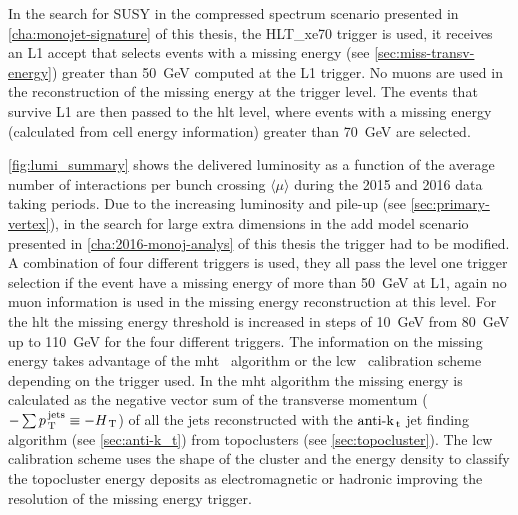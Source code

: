 In the search for SUSY in the compressed spectrum scenario presented in
\cref{cha:monojet-signature} of this thesis, the HLT\_xe70 trigger is used, it
receives an L1 accept that selects events with a missing energy (see
\cref{sec:miss-transv-energy}) greater than 50~GeV computed at the L1 trigger.
No muons are used in the reconstruction of the missing energy at the trigger
level. The events that survive L1 are then passed to the \gls{hlt} level, where
events with a missing energy (calculated from cell energy information) greater
than 70~GeV are selected.

\cref{fig:lumi_summary} shows the delivered luminosity as a function of the
average number of interactions per bunch crossing $\langle \mu \rangle$ during
the 2015 and 2016 data taking periods. Due to the increasing luminosity and
pile-up (see \cref{sec:primary-vertex}), in the search for large extra
dimensions in the \gls{add} model scenario presented in
\cref{cha:2016-monoj-analys} of this thesis the trigger had to be modified. A
combination of four different triggers is used, they all pass the level one
trigger selection if the event have a missing energy of more than 50~GeV at L1,
again no muon information is used in the missing energy reconstruction at this
level. For the \gls{hlt} the missing energy threshold is increased in steps of
10~GeV from 80~GeV up to 110~GeV for the four different triggers. The
information on the missing energy takes advantage of the
\gls{mht}~\cite{MHTAlgorithm} algorithm or the \gls{lcw}~\cite{LCWCalibration}
calibration scheme depending on the trigger used. In the \gls{mht} algorithm the
missing energy is calculated as the negative vector sum of the transverse
momentum ($- \sum p_\mathrm{\, T}^\mathrm{\, jets} \equiv - H_\mathrm{\, T}$) of all the
jets reconstructed with the $\text{anti-k}_\mathrm{\, t}$ jet finding algorithm (see
\cref{sec:anti-k_t}) from topoclusters (see \cref{sec:topocluster}). The
\gls{lcw} calibration scheme uses the shape of the cluster and the energy
density to classify the topocluster energy deposits as electromagnetic or
hadronic improving the resolution of the missing energy trigger.

